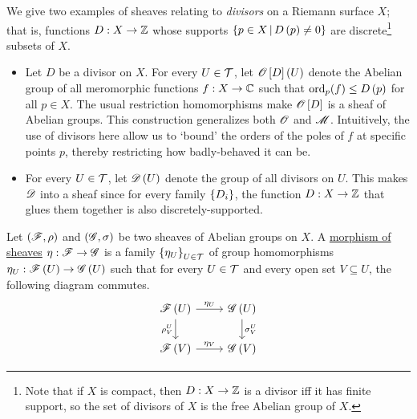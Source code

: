 \documentclass[../Moduli_Spaces_of_Riemann_Surfaces.tex]{subfiles}
\begin{document}
    \begin{example}
        We give two examples of sheaves relating to \textit{divisors} on a Riemann surface $X$; that is, functions $D:X\to\mathbb{Z}$ whose supports $\left\{p\in X\,\middle\vert\, D\left(p\right)\neq0\right\}$ are discrete\footnote{Note that if $X$ is compact, then $D:X\to\mathbb{Z}$ is a divisor iff it has finite support, so the set of divisors of $X$ is the free Abelian group of $X$.} subsets of $X$.
        \begin{itemize}
            \item Let $D$ be a divisor on $X$. For every $U\in\mathcal{T}$, let $\mathscr{O}\left[D\right]\left(U\right)$ denote the Abelian group of all meromorphic functions $f:X\to\mathbb{C}$ such that $\operatorname{ord}_p\!\left(f\right)\leq D\left(p\right)$ for all $p\in X$. The usual restriction homomorphisms make $\mathscr{O}\left[D\right]$ is a sheaf of Abelian groups. This construction generalizes both $\mathscr{O}$ and $\mathscr{M}$. Intuitively, the use of divisors here allow us to `bound' the orders of the poles of $f$ at specific points $p$, thereby restricting how badly-behaved it can be.
            \item For every $U\in\mathcal{T}$, let $\mathscr{D}\left(U\right)$ denote the group of all divisors on $U$. This makes $\mathscr{D}$ into a sheaf since for every family $\left\{D_i\right\}$, the function $D:X\to\mathbb{Z}$ that glues them together is also discretely-supported.\exqed
        \end{itemize}
    \end{example}
    \begin{definition}
        Let $\left(\mathscr{F},\rho\right)$ and $\left(\mathscr{G},\sigma\right)$ be two sheaves of Abelian groups on $X$. A \ul{morphism of sheaves} $\eta:\mathscr{F}\to\mathscr{G}$ is a family $\left\{\eta_U\right\}_{U\in\mathcal{T}}$ of group homomorphisms $\eta_U:\mathscr{F}\left(U\right)\to\mathscr{G}\left(U\right)$ such that for every $U\in\mathcal{T}$ and every open set $V\subseteq U$, the following diagram commutes.
        \begin{equation*}
            \begin{tikzcd}
                \ms{F}\l(U\r) \ar[r, "\eta_U"] \ar[d, "\rho^U_V"'] & \ms{G}\l(U\r) \ar[d, "\sigma^U_V"] \\
                \ms{F}\l(V\r) \ar[r, "\eta_V"] & \ms{G}\l(V\r)
            \end{tikzcd}
        \end{equation*}
    \end{definition}
\end{document}
